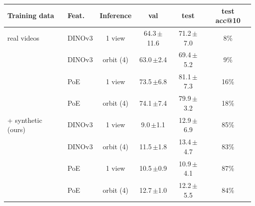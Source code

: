\begin{tabular}{@{}l l c cc c@{}}
\toprule
Training data & Feat. & Inference & val & test & test acc@10 \\
\midrule
real videos & DINOv3 & 1 view & 64.3\,{\scriptsize$\pm$11.6} & 71.2\,{\scriptsize$\pm$7.0} & 8\% \\
 & DINOv3 & orbit (4) & 63.0\,{\scriptsize$\pm$2.4} & 69.4\,{\scriptsize$\pm$5.2} & 9\% \\
 & PoE & 1 view & 73.5\,{\scriptsize$\pm$6.8} & 81.1\,{\scriptsize$\pm$7.3} & 16\% \\
 & PoE & orbit (4) & 74.1\,{\scriptsize$\pm$7.4} & 79.9\,{\scriptsize$\pm$3.2} & 18\% \\
\midrule
+ synthetic (ours) & DINOv3 & 1 view & 9.0\,{\scriptsize$\pm$1.1} & 12.9\,{\scriptsize$\pm$6.9} & 85\% \\
 & DINOv3 & orbit (4) & 11.5\,{\scriptsize$\pm$1.8} & 13.4\,{\scriptsize$\pm$4.7} & 83\% \\
 & PoE & 1 view & 10.5\,{\scriptsize$\pm$0.9} & 10.9\,{\scriptsize$\pm$4.1} & 87\% \\
 & PoE & orbit (4) & 12.7\,{\scriptsize$\pm$1.0} & 12.2\,{\scriptsize$\pm$5.5} & 84\% \\
\bottomrule
\end{tabular}
